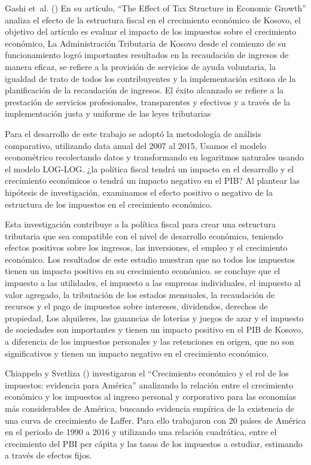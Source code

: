 \documentclass[
  jou,
  floatsintext,
  longtable,
  a4paper,
  nolmodern,
  notxfonts,
  notimes,
  12pt,
  colorlinks=true,linkcolor=blue,citecolor=blue,urlcolor=blue]{apa7}
\begin{document}
Gashi et~al. () En su artículo,
``The Effect of Tax Structure in Economic Growth'' analiza el efecto de
la estructura fiscal en el crecimiento económico de Kosovo, el objetivo
del artículo es evaluar el impacto de los impuestos sobre el crecimiento
económico, La Administración Tributaria de Kosovo desde el comienzo de
su funcionamiento logró importantes resultados en la recaudación de
ingresos de manera eficaz, se refiere a la provisión de servicios de
ayuda voluntaria, la igualdad de trato de todos los contribuyentes y la
implementación exitosa de la planificación de la recaudación de
ingresos. El éxito alcanzado se refiere a la prestación de servicios
profesionales, transparentes y efectivos y a través de la implementación
justa y uniforme de las leyes tributarias

Para el desarrollo de este trabajo se adoptó la metodología de análisis
comparativo, utilizando data anual del 2007 al 2015, Usamos el modelo
econométrico recolectando datos y transformando en logaritmos naturales
usando el modelo LOG-LOG. ¿la política fiscal tendrá un impacto en el
desarrollo y el crecimiento económicos o tendrá un impacto negativo en
el PIB? Al plantear las hipótesis de investigación, examinamos el efecto
positivo o negativo de la estructura de los impuestos en el crecimiento
económico.

Esta investigación contribuye a la política fiscal para crear una
estructura tributaria que sea compatible con el nivel de desarrollo
económico, teniendo efectos positivos sobre los ingresos, las
inversiones, el empleo y el crecimiento económico. Los resultados de
este estudio muestran que no todos los impuestos tienen un impacto
positivo en su crecimiento económico. se concluye que el impuesto a las
utilidades, el impuesto a las empresas individuales, el impuesto al
valor agregado, la tributación de los estados mensuales, la recaudación
de recursos y el pago de impuestos sobre intereses, dividendos, derechos
de propiedad, Los alquileres, las ganancias de loterías y juegos de azar
y el impuesto de sociedades son importantes y tienen un impacto positivo
en el PIB de Kosovo, a diferencia de los impuestos personales y las
retenciones en origen, que no son significativos y tienen un impacto
negativo en el crecimiento económico.

Chiappelo y Svetliza ()
investigaron el ``Crecimiento económico y el rol de los impuestos:
evidencia para América'' analizando la relación entre el crecimiento
económico y los impuestos al ingreso personal y corporativo para las
economías más considerables de América, buscando evidencia empírica de
la existencia de una curva de crecimiento de Laffer. Para ello
trabajaron con 20 países de América en el periodo de 1990 a 2016 y
utilizando una relación cuadrática, entre el crecimiento del PBI per
cápita y las tasas de los impuestos a estudiar, estimando a través de
efectos fijos.
\end{document}
